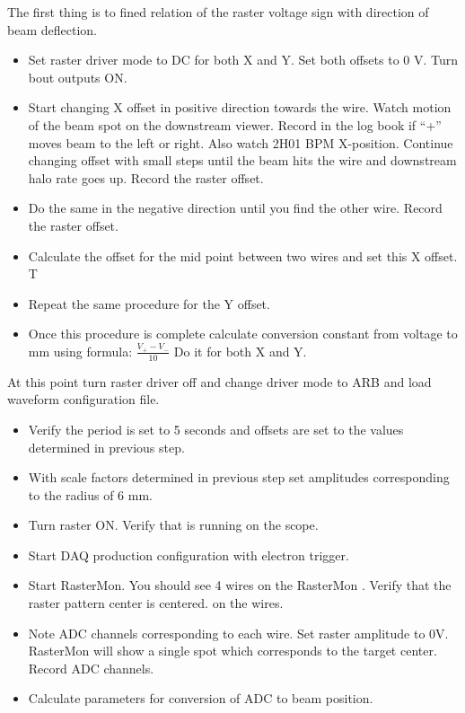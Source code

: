 The first thing is to fined relation of the raster voltage sign with direction of beam deflection.  

\begin{itemize}
\item Set raster driver mode to DC for both X and Y. Set both offsets to 0 V.
Turn bout outputs ON. 
\item Start changing X offset in positive direction towards the wire. Watch motion of the beam spot on the downstream viewer. Record in the log book if ``+'' moves beam to the left or right. Also watch 2H01 BPM X-position. Continue changing offset with small steps until  the beam hits the wire and downstream halo rate goes up. Record the raster offset. 
\item Do the same in the negative direction until you find the other wire. Record the raster offset. 
\item Calculate the offset for the mid point between two wires and set this X offset. T
\item Repeat the same procedure for the Y offset. 
\item Once this procedure is complete calculate conversion constant from voltage to mm using formula: $\frac{V_+ - V_-}{10}$ Do it for both X and Y.
\end{itemize}


At this point turn raster driver off and change driver mode to ARB and load waveform configuration file. 


\begin{itemize}
\item Verify the period is set to 5 seconds and offsets are set to the values determined in previous step. 
\item With scale factors determined in previous step set amplitudes corresponding to the radius of 6 mm.
\item Turn raster ON. Verify that is running on the scope.
\item Start DAQ production configuration with electron trigger. 
\item Start RasterMon. You should see 4 wires on the RasterMon \cite{rastermon}. Verify that the raster pattern center is centered. on the wires. 
\item Note ADC channels corresponding to each wire. Set raster amplitude to 0V. RasterMon will show a single spot which corresponds to the target center. Record ADC channels.
\item Calculate parameters for conversion of ADC to beam position.
\end{itemize}


